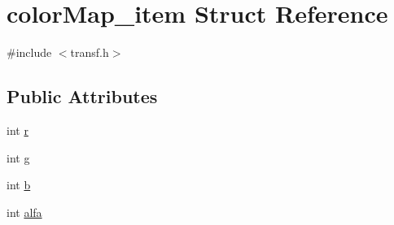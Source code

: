 \hypertarget{structcolorMap__item}{
\section{colorMap\_\-item Struct Reference}
\label{structcolorMap__item}
}


{\ttfamily \#include $<$transf.h$>$}

\subsection*{Public Attributes}
\begin{DoxyCompactItemize}
\item 
int \hyperlink{structcolorMap__item_a3311c0394d61bb9b970152d46e323a32}{r}
\item 
int \hyperlink{structcolorMap__item_aced65d1d505d181eb5e553afd5713155}{g}
\item 
int \hyperlink{structcolorMap__item_a00afd487beb2d02973ab14245f82bd9b}{b}
\item 
int \hyperlink{structcolorMap__item_ad487f4e8f4084352134028ad15c666df}{alfa}
\end{DoxyCompactItemize}


